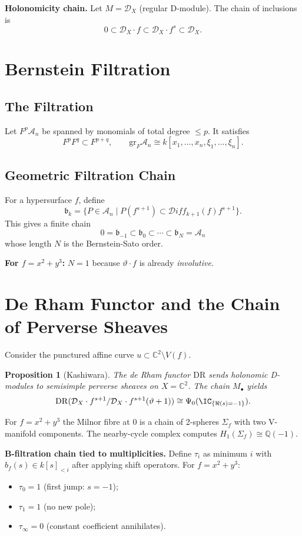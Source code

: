 \documentclass[12pt]{article}
\theoremstyle{plain}
\newtheorem{proposition}[theorem]{Proposition}
\theoremstyle{remark}
\newcommand{\A}{\mathcal{A}}
\newcommand{\D}{\mathcal{D}}
\newcommand{\Diff}{\mathcal{D}iff}
\newcommand{\DR}{\mathrm{DR}}
\newcommand{\CC}{\mathbb{C}}
\newcommand{\QQ}{\mathbb{Q}}
\newcommand{\bF}{\mathfrak{b}}
\newcommand{\vertF}{\vartheta}
\newcommand{\Nearby}{\Psi}
\begin{document}
\medskip
\noindent\textbf{Holonomicity chain.}
Let $M = \D_X$ (regular D-module). The chain of inclusions is
\[ 0 \subset \D_X \cdot f \subset \D_X \cdot f^s \subset \D_X .\]

\section{Bernstein Filtration}

\subsection{The Filtration}
Let $F^p \A_n$ be spanned by monomials of total degree $\le p$.
It satisfies
\[ F^p F^q \subset F^{p+q}, \qquad
  \text{gr}_F \A_n \cong k[x_1,\dots,x_n,\xi_1,\dots,\xi_n]. \]

\subsection{Geometric Filtration Chain}
For a hypersurface $f$, define
\[ \bF_k = \{P \in \A_n \mid P(f^{s+1}) \subset \Diff_{k+1}(f)f^{s+1}\}. \]
This gives a finite chain
\[
  0 = \bF_{-1} \subset \bF_0 \subset \cdots \subset \bF_N = \A_n
\]
whose length $N$ is the Bernstein-Sato order.

\medskip
\noindent\textbf{For $f=x^2+y^3$:} $N=1$ because
$\vertF\cdot f$ is already \emph{involutive}.

\section{De Rham Functor and the Chain of Perverse Sheaves}

Consider the punctured affine curve $u \subset \CC^2 \setminus V(f)$.
\begin{proposition}[Kashiwara]
  The de Rham functor $\DR$ sends holonomic D-modules
  to semisimple perverse sheaves on $X = \CC^2$.
  The chain $M_\bullet$ yields
  \[ \DR(\D_X \cdot f^{s+1}/\D_X \cdot f^{s+1}(\vertF+1)) \cong
     \Nearby_0(\IC_{\{\Re(s)=-1\}}). \]
\end{proposition}

For $f=x^2+y^3$ the Milnor fibre at $0$ is a chain of
2-spheres $\Sigma_f$ with two V-manifold components.
The nearby-cycle complex computes $H_1(\Sigma_f) \cong \QQ(-1)$.

\medskip
\noindent\textbf{B-filtration chain tied to multiplicities.}
Define $\tau_i$ as minimum $i$ with
$b_f(s) \in k[s]_{<i}$ after applying shift operators.
For $f=x^2+y^3$:
\begin{itemize}
  \item $\tau_0 = 1$ (first jump: $s=-1$);
  \item $\tau_1 = 1$ (no new pole);
  \item $\tau_\infty = 0$ (constant coefficient annihilates).
\end{itemize}
\end{document}
